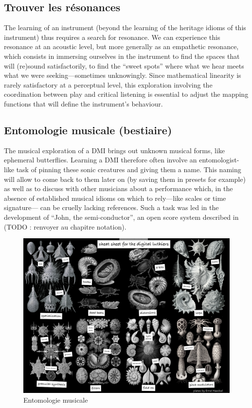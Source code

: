 	
\subsection{Trouver les résonances}

The learning of an instrument (beyond the learning of the heritage idioms of this instrument) thus requires a search for resonance. We can experience this resonance at an acoustic level, but more generally as an empathetic resonance, which consists in immersing ourselves in the instrument to find the spaces that will (re)sound satisfactorily, to find the “sweet spots” where what we hear meets what we were seeking—sometimes unknowingly. Since mathematical linearity is rarely satisfactory at a perceptual level, this exploration involving the coordination between play and critical listening is essential to adjust the mapping functions that will define the instrument's behaviour.
	
\subsection{Entomologie musicale (bestiaire)}
The musical exploration of a DMI brings out unknown musical forms, like ephemeral butterflies. Learning a DMI therefore often involve an entomologist-like task of pinning these sonic creatures and giving them a name. This naming will allow to come back to them later on (by saving them in presets for example) as well as to discuss with other musicians about a performance which, in the absence of established musical idioms on which to rely—like scales or time signature— can be cruelly lacking references. Such a task was led in the development of “John, the semi-conductor”, an open score system described in \cite{goudard_john_2018} (TODO : renvoyer au chapitre notation).



\begin{figure}[!htbp]
	\includegraphics[width=\textwidth]{gfx/04_ephemeral/Bestiaire.png}
	\caption{Entomologie musicale}
	\label{fig:ephemeral:entomologie}
\end{figure}

